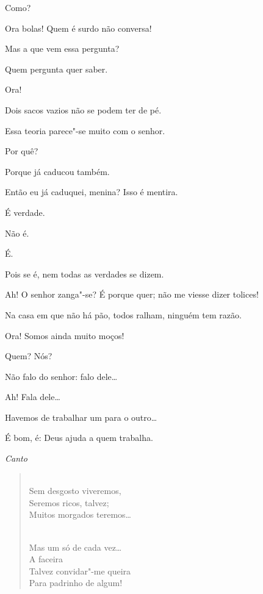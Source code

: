   Como?

  Ora bolas! Quem é surdo não conversa!

  Mas a que vem essa pergunta?

   Quem pergunta quer saber.

  Ora!

   Dois sacos vazios não se podem ter de pé.

  Essa teoria parece"-se muito com o senhor.

  Por quê?

  Porque já caducou também.

   Então eu já caduquei, menina?  Isso é
mentira.

  É verdade.

  Não é.

  É.

  Pois se é, nem todas as verdades se dizem.  

  Ah! O senhor zanga"-se? É porque quer; não me viesse dizer tolices!

  Na casa em
que não há pão, todos ralham, ninguém tem razão.

  Ora! Somos ainda muito moços!

  Quem? Nós?

   Não falo do senhor: falo dele\ldots{}

  Ah! Fala dele\ldots{}

  Havemos de trabalhar um para o outro\ldots{}

  É bom, é: Deus ajuda a quem trabalha.

{\smallskip\raggedleft\itshape Canto\par}
\begin{verse}
\\
Sem desgosto viveremos,\\
Seremos ricos, talvez;\\
Muitos morgados teremos\ldots{}

{}\\
Mas um só de cada vez\ldots{}\\
 A faceira\\
Talvez convidar"-me queira\\
Para padrinho de algum!
\end{verse}

